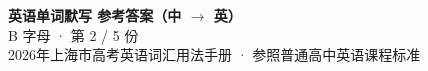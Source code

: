 \documentclass[10pt,a4paper]{article}
\begin{document}
\pagestyle{plain}

\begin{center}
{\LARGE\bfseries 英语单词默写 \quad 参考答案（中 $\to$ 英）}\\[0.22em]
{\large B 字母 · 第 2 / 5 份}\\[0.18em]
{\small 2026年上海市高考英语词汇用法手册 · 参照普通高中英语课程标准}
\end{center}

\vspace{0.2em}
\noindent{\color{rulegray}\rule{\textwidth}{0.8pt}}

\vspace{0.35em}

\vspace{0.25em}
\renewcommand{\arraystretch}{1.32}
\end{document}
